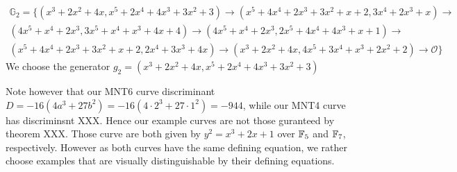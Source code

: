 \begin{multline*}
\mathbb{G}_2=\{ 
(x^3+2x^2+4x,x^5+2x^4+4x^3+3x^2+3)\to
(x^5+4x^4+2x^3+3x^2+x+2,3x^4+2x^3+x)\to\\
(4x^5+x^4+2x^3,3x^5+x^4+x^3+4x+4)\to
(4x^5+x^4+2x^3,2x^5+4x^4+4x^3+x+1) \to\\
(x^5+4x^4+2x^3+3x^2+x+2,2x^4+3x^3+4x)\to
(x^3+2x^2+4x,4x^5+3x^4+x^3+2x^2+2)\to
\mathcal{O}\}
\end{multline*}
We choose the generator $g_2 = (x^3+2x^2+4x,x^5+2x^4+4x^3+3x^2+3)$

\begin{remark}
Note however that our MNT6 curve discriminant $D=-16(4a^3 + 27 b^2)= -16(4\cdot 2^3 + 27\cdot 1^2)=-944$, while our MNT4 curve has discriminsnt XXX. Hence our example curves are not those guranteed by theorem XXX. Those curve are both given by $y^2= x^3 + 2x +1$ over $\mathbb{F}_5$ and $\mathbb{F}_7$, respectively. However as both curves have the same defining equation, we rather choose examples that are visually distinguishable by their defining equations.
\end{remark}


